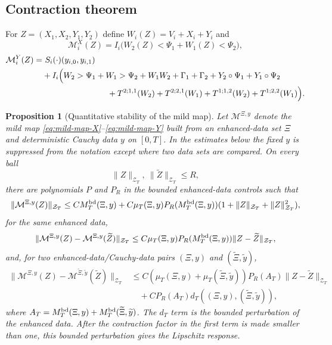 \documentclass[10pt]{amsart}
\numberwithin{equation}{section}
\theoremstyle{plain}
\newtheorem{proposition}[theorem]{Proposition}
\theoremstyle{definition}
\theoremstyle{remark}
\newcommand{\calZ}{\mathcal{Z}}
\begin{document}
\subsection{Contraction theorem}
For $Z=(X_1,X_2,Y_1,Y_2)$ define $W_i(Z)=V_i+X_i+Y_i$ and
\begin{equation}\label{eq:mild-map-X}
\mathcal M_i^X(Z)=I_i\bigl(W_2(Z)<\Psi_1+W_1(Z)<\Psi_2\bigr),
\end{equation}
\begin{align}\label{eq:mild-map-Y}
\mathcal M_i^Y(Z)=&\ S_i(\cdot)(y_{i,0},y_{i,1})\\
&+I_i\Bigl(W_2>\Psi_1+W_1>\Psi_2+W_1W_2+
\Gamma_1+\Gamma_2+Y_2\circ\Psi_1+Y_1\circ\Psi_2\nonumber\\
&\hspace{2.8cm}
+T^{2;1,1}(W_2)+T^{2;2,1}(W_1)+T^{1;1,2}(W_2)+T^{1;2,2}(W_1)\Bigr).
\end{align}

\begin{proposition}[Quantitative stability of the mild map]\label{prop:mild-map-stability}
Let $\mathcal M^{\Xi,y}$ denote the mild map \eqref{eq:mild-map-X}--\eqref{eq:mild-map-Y} built from an enhanced-data set $\Xi$ and deterministic Cauchy data $y$ on $[0,T]$.  In the estimates below the fixed $y$ is suppressed from the notation except where two data sets are compared.  On every ball
\[
        \|Z\|_{\calZ_T},\ \|\widetilde Z\|_{\calZ_T}\le R,
\]
there are polynomials $P$ and $P_R$ in the bounded enhanced-data controls such that
\begin{equation}\label{eq:mild-map-bounded-prop}
        \|\mathcal M^{\Xi,y}(Z)\|_{\calZ_T}
        \le C M_T^{\rm bd}(\Xi,y)
        +C\mu_T(\Xi,y)P_R(M_T^{\rm bd}(\Xi,y))
          (1+\|Z\|_{\calZ_T}+\|Z\|_{\calZ_T}^2),
\end{equation}
for the same enhanced data,
\begin{equation}\label{eq:mild-map-contract-prop}
        \|\mathcal M^{\Xi,y}(Z)-\mathcal M^{\Xi,y}(\widetilde Z)\|_{\calZ_T}
        \le C\mu_T(\Xi,y)P_R(M_T^{\rm bd}(\Xi,y))
        \|Z-\widetilde Z\|_{\calZ_T},
\end{equation}
and, for two enhanced-data/Cauchy-data pairs $(\Xi,y)$ and $(\widetilde\Xi,\widetilde y)$,
\begin{equation}\label{eq:mild-map-data-prop}
\begin{aligned}
        \|\mathcal M^{\Xi,y}(Z)-\mathcal M^{\widetilde\Xi,\widetilde y}(\widetilde Z)\|_{\calZ_T}
        &\le C(\mu_T(\Xi,y)+\mu_T(\widetilde\Xi,\widetilde y))
             P_R(A_T)\|Z-\widetilde Z\|_{\calZ_T}\\
        &\quad +C P_R(A_T)d_T((\Xi,y),(\widetilde\Xi,\widetilde y)),
\end{aligned}
\end{equation}
where $A_T=M_T^{\rm bd}(\Xi,y)+M_T^{\rm bd}(\widetilde\Xi,\widetilde y)$.  The $d_T$ term is the bounded perturbation of the enhanced data.  After the contraction factor in the first term is made smaller than one, this bounded perturbation gives the Lipschitz response.
\end{proposition}
\end{document}
